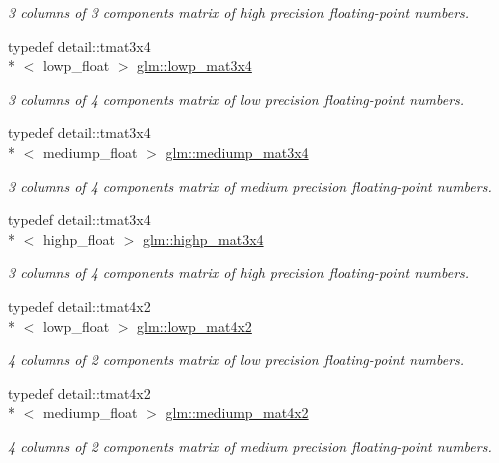 \begin{DoxyCompactItemize}
\begin{DoxyCompactList}\small\item\em 3 columns of 3 components matrix of high precision floating-\/point numbers. \end{DoxyCompactList}\item 
typedef detail\-::tmat3x4\\*
$<$ lowp\-\_\-float $>$ \hyperlink{group__core__precision_ga1b202ac2d7cea4f30ad802471f6081ac}{glm\-::lowp\-\_\-mat3x4}
\begin{DoxyCompactList}\small\item\em 3 columns of 4 components matrix of low precision floating-\/point numbers. \end{DoxyCompactList}\item 
typedef detail\-::tmat3x4\\*
$<$ mediump\-\_\-float $>$ \hyperlink{group__core__precision_gaa530d8f06a8f1187cd1e0c2ce46cac42}{glm\-::mediump\-\_\-mat3x4}
\begin{DoxyCompactList}\small\item\em 3 columns of 4 components matrix of medium precision floating-\/point numbers. \end{DoxyCompactList}\item 
typedef detail\-::tmat3x4\\*
$<$ highp\-\_\-float $>$ \hyperlink{group__core__precision_ga55fe92f6217fa20816f52f748fb399c7}{glm\-::highp\-\_\-mat3x4}
\begin{DoxyCompactList}\small\item\em 3 columns of 4 components matrix of high precision floating-\/point numbers. \end{DoxyCompactList}\item 
typedef detail\-::tmat4x2\\*
$<$ lowp\-\_\-float $>$ \hyperlink{group__core__precision_gaf8f0828066f6c6fbd2c815832743e401}{glm\-::lowp\-\_\-mat4x2}
\begin{DoxyCompactList}\small\item\em 4 columns of 2 components matrix of low precision floating-\/point numbers. \end{DoxyCompactList}\item 
typedef detail\-::tmat4x2\\*
$<$ mediump\-\_\-float $>$ \hyperlink{group__core__precision_gad8c4b5a61db5087e32506b2022442edd}{glm\-::mediump\-\_\-mat4x2}
\begin{DoxyCompactList}\small\item\em 4 columns of 2 components matrix of medium precision floating-\/point numbers. \end{DoxyCompactList}\item 

\end{DoxyCompactItemize}
